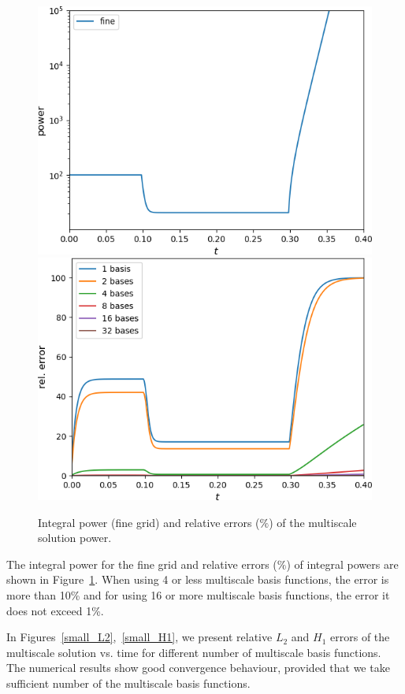 \documentclass[preprint]{elsarticle}
\begin{document}
\begin{figure}[ht]
	\centering
		\includegraphics[width=0.45\linewidth]{small/power_fine.png} \hspace{2em}
		\includegraphics[width=0.45\linewidth]{small/power_error.png}
	\caption{Integral power (fine grid) and relative errors ($\%$) of the multiscale solution power.}
	\label{small_power}
\end{figure}
 
The integral power for the fine grid and relative errors ($\%$) of integral powers are shown in Figure~\ref{small_power}.
When using 4 or less multiscale basis functions, the error is more than 10\% and for using 16 or more multiscale basis functions, the error it does not exceed 1\%.

In Figures~\ref{small_L2},~\ref{small_H1}, we present relative $L_2$ and $H_1$ errors of the multiscale solution vs. time for different number of multiscale basis functions.
The numerical results show good convergence behaviour, provided that we take sufficient number of the multiscale basis functions.
\end{document}
